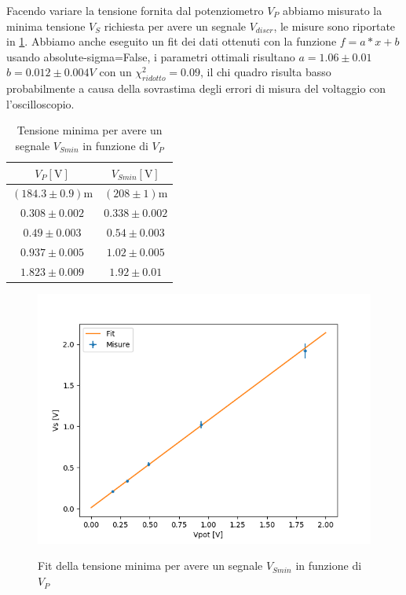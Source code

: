 \documentclass{article}
\begin{document}
		Facendo variare la tensione fornita dal potenziometro $V_P$ abbiamo misurato la minima tensione $V_S$ richiesta per avere un segnale $V_{discr}$, le misure sono riportate in \ref{tab 1c2}. Abbiamo anche eseguito un fit dei dati ottenuti con la funzione $f=a*x+b$ usando absolute-sigma=False, i parametri ottimali risultano $a=1.06\pm0.01$ $b=0.012\pm0.004 V$ con un $\chi^2_{ridotto}=0.09$, il chi quadro risulta basso probabilmente a causa della sovrastima degli errori di misura del voltaggio con l'oscilloscopio.
		\begin{table}
			\begin{center}
				\begin{tabular}{cc}
					\hline
					$V_P [\mathrm{V}]$&$V_{Smin} [\mathrm{V}]$ \\
					\hline
					$(184.3\pm0.9) \mathrm{m}$ & $(208\pm1)\mathrm{m}$ \\
					$0.308\pm0.002$ & $0.338\pm0.002$ \\
					$0.49\pm0.003$ & $0.54\pm0.003$ \\
					$0.937\pm0.005$ & $1.02\pm0.005$ \\
					$1.823\pm0.009$ & $1.92\pm0.01$ \\
					\hline
				\end{tabular}
			\end{center}
			\label{tab 1c2}
			\caption{Tensione minima per avere un segnale $V_{Smin}$ in funzione di $V_{P}$}	
		\end{table}
		
		\begin{figure}
			\centering
			\includegraphics[width=\linewidth]{immagini/1c-2.png}
			\label{fit:1c-2}
			\caption{Fit della tensione minima per avere un segnale $V_{Smin}$ in funzione di $V_{P}$}
		\end{figure}
		\newpage
\end{document}

